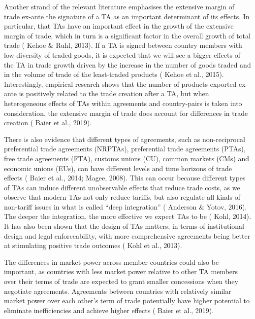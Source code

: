 \documentclass[12pt]{article}%
\begin{document}
Another strand of the relevant literature emphasises the extensive
margin of trade ex-ante the signature of a TA as an important
determinant of its effects. In particular, that TAs have an important
effect in the growth of the extensive margin of trade, which in turn is
a significant factor in the overall growth of total trade (\cite{kehoe_how_2013} Kehoe \&
Ruhl, 2013). If a TA is signed between country members with low
diversity of traded goods, it is expected that we will see a bigger
effects of the TA in trade growth driven by the increase in the number
of goods traded and in the volume of trade of the least-traded products
(\cite{kehoe_using_2015} Kehoe et al., 2015). Interestingly, empirical research shows that the
number of products exported ex-ante is positively related to the trade
creation after a TA, but when heterogeneous effects of TAs within
agreements and country-pairs is taken into consideration, the extensive
margin of trade does account for differences in trade creation (\cite{baier_widely_2019} Baier et
al., 2019).

There is also evidence that different types of agreements, such as
non-reciprocal preferential trade agreements (NRPTAs), preferential
trade agreements (PTAs), free trade agreements (FTA), customs unions
(CU), common markets (CMs) and economic unions (EUs), can have different
levels and time horizons of trade effects (\cite{baier_economic_2014} Baier et al., 2014; \cite{magee_new_2008-1} Magee,
2008). This can occur because different types of TAs can induce
different unobservable effects that reduce trade costs, as we observe
that modern TAs not only reduce tariffs, but also regulate all kinds of
non-tariff issues in what is called ``deep integration'' (\cite{anderson_terms_2016} Anderson \&
Yotov, 2016). The deeper the integration, the more effective we expect
TAs to be (\cite{kohl_we_2014} Kohl, 2014). It has also been shown that the design of TAs
matters, in terms of institutional design and legal enforceability, with
more comprehensive agreements being better at stimulating positive trade
outcomes (\cite{kohl_trade_2013} Kohl et al., 2013).

The differences in market power across member countries could also be
important, as countries with less market power relative to other TA
members over their terms of trade are expected to grant smaller
concessions when they negotiate agreements. Agreements between countries
with relatively similar market power over each other's term of trade
potentially have higher potential to eliminate inefficiencies and
achieve higher effects (\cite{baier_widely_2019} Baier et al., 2019).
\end{document}
